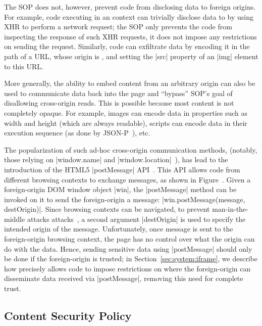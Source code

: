 The SOP does not, however, prevent code from disclosing data to
foreign origins.
%
For example, code executing in an  context can trivially
disclose data to  by using XHR to perform a network
request; the SOP only prevents the code from inspecting the response
of such XHR requests, it does not impose any restrictions on sending
the request.
%
Similarly, code can exfiltrate data by encoding it in the path of a
URL, whose origin is , and setting the \js|src| property
of an \js|img| element to this URL.

More generally, the ability to embed content from an arbitrary origin
can also be used to communicate data back into the page and ``bypass''
SOP's goal of disallowing cross-origin reads.
%
This is possible because most content is not completely opaque. 
%
For example, images can encode data in properties such as width and
height (which are always readable), scripts can encode data in their
execution sequence (as done by JSON-P~), etc.
%

The popularization of such ad-hoc cross-origin communication methods,
(notably, those relying on \js|window.name| and
\js|window.location|~), has lead to the
introduction of the HTML5 \js|postMessage| API~.
%
This API allows code from different browsing contexts to exchange
messages, as shown in Figure~.
%
Given a foreign-origin DOM window object \js|win|, the
\js|postMessage| method can be invoked on it to send the
foreign-origin a message: \js|win.postMessage(message, destOrigin)|.
%
Since browsing contexts can be navigated, to prevent man-in-the-middle
attacks attacks~, a second argument
\js|destOrigin| is used to specify the intended origin of the message.
%
Unfortunately, once message is sent to the foreign-origin browsing
context, the page has no control over what the origin can do with the
data.
%
Hence, sending sensitive data using \js|postMessage| should only be
done if the foreign-origin is trusted;
%
in Section~\ref{sec:system:iframe}, we describe how \sys{} precisely
allows code to impose restrictions on where the foreign-origin can
disseminate data received via \js|postMessage|, removing this need for
complete trust.

\subsection{Content Security Policy} 
\label{sec:background:csp}

